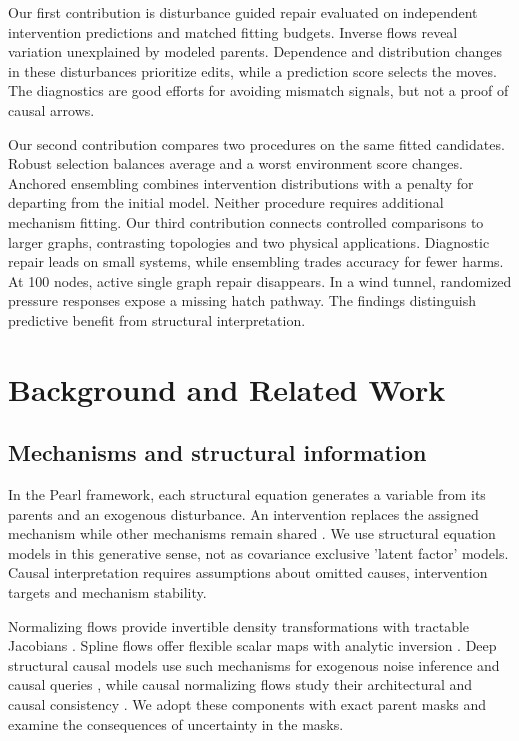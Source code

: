 \documentclass{svproc}
\begin{document}
Our first contribution is disturbance guided repair evaluated on independent
intervention predictions and matched fitting budgets. Inverse flows reveal
variation unexplained by modeled parents. Dependence and distribution changes
in these disturbances prioritize edits, while a prediction score selects the moves.
The diagnostics are good efforts for avoiding mismatch signals, but not a proof of causal arrows.

Our second contribution compares two procedures on the same fitted candidates.
Robust selection balances average and a worst environment score changes. Anchored
ensembling combines intervention distributions with a penalty for departing from
the initial model. Neither procedure requires additional mechanism fitting.
Our third contribution connects controlled comparisons to larger graphs,
contrasting topologies and two physical applications. Diagnostic repair leads
on small systems, while ensembling trades accuracy for fewer harms. At 100
nodes, active single graph repair disappears. In a wind tunnel, randomized
pressure responses expose a missing hatch pathway. The findings distinguish
predictive benefit from structural interpretation.






\section{Background and Related Work}
\subsection{Mechanisms and structural information}
In the Pearl framework, each structural equation generates a variable from its
parents and an exogenous disturbance. An intervention replaces the assigned
mechanism while other mechanisms remain shared \cite{pearl2009}. We use structural
equation models in this generative sense, not as covariance exclusive 'latent factor'
models. Causal interpretation requires assumptions about omitted causes,
intervention targets and mechanism stability.

Normalizing flows provide invertible density transformations with tractable
Jacobians \cite{papamakarios2021}. Spline flows offer flexible scalar maps with
analytic inversion \cite{durkan2019}. Deep structural causal models use such
mechanisms for exogenous noise inference and causal queries \cite{pawlowski2020},
while causal normalizing flows study their architectural and causal consistency
\cite{javaloy2023}. We adopt these components with exact parent masks and examine
the consequences of uncertainty in the masks.
\end{document}
